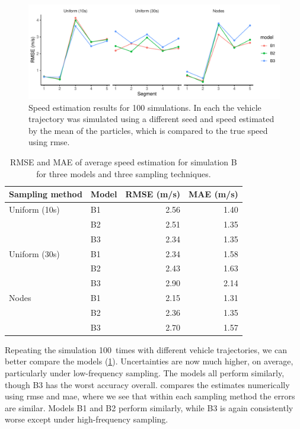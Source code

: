\begin{knitrout}\small
{}\color{fgcolor}\begin{figure}[p]
\includegraphics[width=\maxwidth]{figure/sim2_pf_full-1} \caption[Results for simulation B replicated 100~times]{Speed estimation results for 100 simulations. In each the vehicle trajectory was simulated using a different seed and speed estimated by the mean of the particles, which is compared to the true speed using \gls{rmse}.}\label{fig:sim2_pf_full}
\end{figure}

\begin{table}[p]

\caption{\label{tab:sim2_pf_full}RMSE and MAE of average speed estimation for simulation B for three models and three sampling techniques.}
\centering
\fontsize{8}{10}\selectfont
\begin{tabular}[t]{llrr}
\toprule
Sampling method & Model & RMSE (m/s) & MAE (m/s)\\
\midrule
Uniform (10s) & B1 & 2.56 & 1.40\\
 & B2 & 2.51 & 1.35\\
 & B3 & 2.34 & 1.35\\
\midrule
Uniform (30s) & B1 & 2.34 & 1.58\\
 & B2 & 2.43 & 1.63\\
 & B3 & 2.90 & 2.14\\
\midrule
Nodes & B1 & 2.15 & 1.31\\
 & B2 & 2.36 & 1.35\\
 & B3 & 2.70 & 1.57\\
\bottomrule
\end{tabular}
\end{table}


\end{knitrout}





Repeating the simulation 100~times with different vehicle trajectories, we can better compare the models (\cref{fig:sim2_pf_full}). Uncertainties are now much higher, on average, particularly under low-frequency sampling. The models all perform similarly, though B3 has the worst accuracy overall.  compares the estimates numerically using \gls{rmse} and \gls{mae}, where we see that within each sampling method the errors are similar. Models B1 and B2 perform similarly, while B3 is again consistently worse except under high-frequency sampling.




